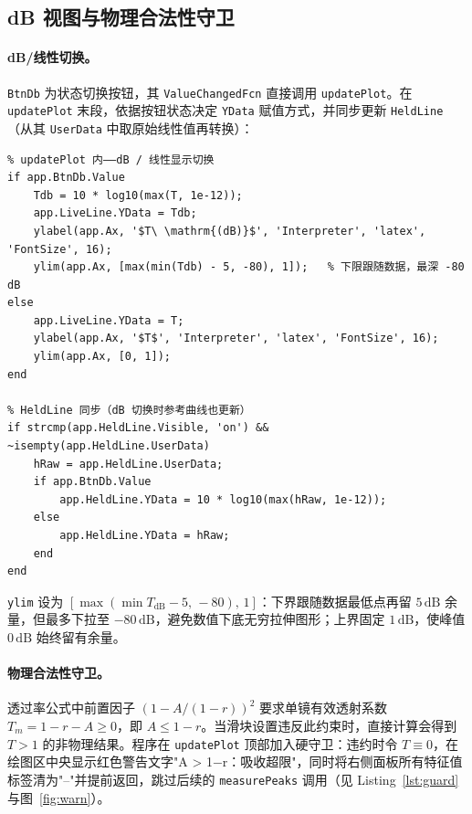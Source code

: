 \documentclass[10.5pt]{config}
\begin{document}
\subsection{dB 视图与物理合法性守卫}
\label{ssec:db}

\paragraph{dB/线性切换。} \texttt{BtnDb} 为状态切换按钮，其 \texttt{ValueChangedFcn} 直接调用 \texttt{updatePlot}。在 \texttt{updatePlot} 末段，依据按钮状态决定 \texttt{YData} 赋值方式，并同步更新 \texttt{HeldLine}（从其 \texttt{UserData} 中取原始线性值再转换）：

\begin{listing}[H]
\begin{verbatim}
% updatePlot 内——dB / 线性显示切换
if app.BtnDb.Value
    Tdb = 10 * log10(max(T, 1e-12));
    app.LiveLine.YData = Tdb;
    ylabel(app.Ax, '$T\ \mathrm{(dB)}$', 'Interpreter', 'latex', 'FontSize', 16);
    ylim(app.Ax, [max(min(Tdb) - 5, -80), 1]);   % 下限跟随数据，最深 -80 dB
else
    app.LiveLine.YData = T;
    ylabel(app.Ax, '$T$', 'Interpreter', 'latex', 'FontSize', 16);
    ylim(app.Ax, [0, 1]);
end

% HeldLine 同步（dB 切换时参考曲线也更新）
if strcmp(app.HeldLine.Visible, 'on') && ~isempty(app.HeldLine.UserData)
    hRaw = app.HeldLine.UserData;
    if app.BtnDb.Value
        app.HeldLine.YData = 10 * log10(max(hRaw, 1e-12));
    else
        app.HeldLine.YData = hRaw;
    end
end
\end{verbatim}
\caption{\texttt{updatePlot} 中的 dB 切换逻辑：\texttt{ylim} 跟随数据下限，参考曲线同步转换}
\end{listing}

\noindent \texttt{ylim} 设为 $[\max(\min T_{\mathrm{dB}}-5,\,-80),\,1]$：下界跟随数据最低点再留 $5\,\mathrm{dB}$ 余量，但最多下拉至 $-80\,\mathrm{dB}$，避免数值下底无穷拉伸图形；上界固定 $1\,\mathrm{dB}$，使峰值 $0\,\mathrm{dB}$ 始终留有余量。

\paragraph{物理合法性守卫。} 透过率公式中前置因子 $(1-A/(1-r))^2$ 要求单镜有效透射系数 $T_m=1-r-A\ge0$，即 $A\le1-r$。当滑块设置违反此约束时，直接计算会得到 $T>1$ 的非物理结果。程序在 \texttt{updatePlot} 顶部加入硬守卫：违约时令 $T\equiv0$，在绘图区中央显示红色警告文字"A > 1−r：吸收超限"，同时将右侧面板所有特征值标签清为"--"并提前返回，跳过后续的 \texttt{measurePeaks} 调用（见 Listing~\ref{lst:guard} 与图~\ref{fig:warn}）。
\end{document}
